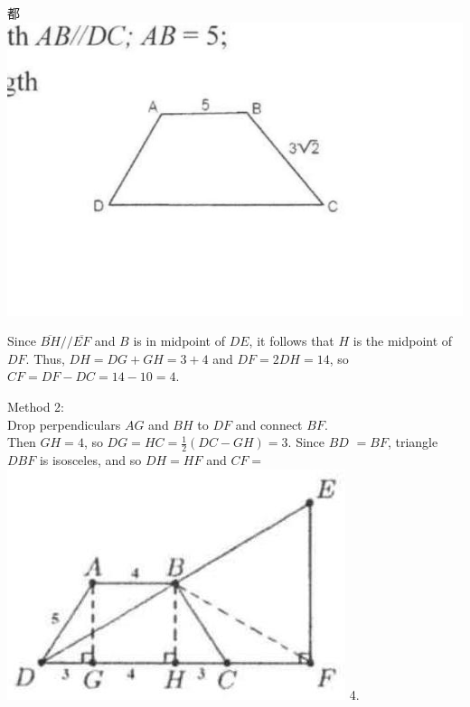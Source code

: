 \documentclass{article}
\begin{document}
都\\
\centering
\includegraphics[width=\textwidth]{images/076.jpg}


Since \(\overline{B H} / / \overline{E F}\) and \(B\) is in midpoint of \(D E\), it follows that \(H\) is the midpoint of \(D F\). Thus, \(D H=D G+G H=3+4\) and \(D F=2 D H=14\), so \(C F=D F-D C=14-10=4\).

Method 2:\\
Drop perpendiculars \(A G\) and \(B H\) to \(D F\) and connect \(B F\).\\
Then \(G H=4\), so \(D G=H C=\frac{1}{2}(D C-G H)=3\). Since \(B D\) \(=B F\), triangle \(D B F\) is isosceles, and so \(D H=H F\) and \(C F=\)\\
\includegraphics[width=\textwidth]{images/077(2).jpg} 4.
\end{document}
